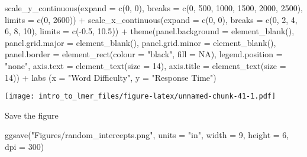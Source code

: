\documentclass[
]{article}
\newenvironment{Shaded}{\begin{snugshade}}{\end{snugshade}}
\newcommand{\AttributeTok}[1]{\textcolor[rgb]{0.77,0.63,0.00}{#1}}
\newcommand{\ConstantTok}[1]{\textcolor[rgb]{0.00,0.00,0.00}{#1}}
\newcommand{\DecValTok}[1]{\textcolor[rgb]{0.00,0.00,0.81}{#1}}
\newcommand{\FloatTok}[1]{\textcolor[rgb]{0.00,0.00,0.81}{#1}}
\newcommand{\FunctionTok}[1]{\textcolor[rgb]{0.00,0.00,0.00}{#1}}
\newcommand{\NormalTok}[1]{#1}
\newcommand{\SpecialCharTok}[1]{\textcolor[rgb]{0.00,0.00,0.00}{#1}}
\newcommand{\StringTok}[1]{\textcolor[rgb]{0.31,0.60,0.02}{#1}}
\begin{document}
\begin{Shaded}
\begin{Highlighting}[]
  \FunctionTok{scale\_y\_continuous}\NormalTok{(}\AttributeTok{expand =} \FunctionTok{c}\NormalTok{(}\DecValTok{0}\NormalTok{, }\DecValTok{0}\NormalTok{), }\AttributeTok{breaks =} \FunctionTok{c}\NormalTok{(}\DecValTok{0}\NormalTok{, }\DecValTok{500}\NormalTok{, }\DecValTok{1000}\NormalTok{, }\DecValTok{1500}\NormalTok{, }\DecValTok{2000}\NormalTok{, }\DecValTok{2500}\NormalTok{), }
                     \AttributeTok{limits =} \FunctionTok{c}\NormalTok{(}\DecValTok{0}\NormalTok{, }\DecValTok{2600}\NormalTok{)) }\SpecialCharTok{+}
  \FunctionTok{scale\_x\_continuous}\NormalTok{(}\AttributeTok{expand =} \FunctionTok{c}\NormalTok{(}\DecValTok{0}\NormalTok{, }\DecValTok{0}\NormalTok{), }\AttributeTok{breaks =} \FunctionTok{c}\NormalTok{(}\DecValTok{0}\NormalTok{, }\DecValTok{2}\NormalTok{, }\DecValTok{4}\NormalTok{, }\DecValTok{6}\NormalTok{, }\DecValTok{8}\NormalTok{, }\DecValTok{10}\NormalTok{), }
                     \AttributeTok{limits =} \FunctionTok{c}\NormalTok{(}\SpecialCharTok{{-}}\FloatTok{0.5}\NormalTok{, }\FloatTok{10.5}\NormalTok{)) }\SpecialCharTok{+}
  \FunctionTok{theme}\NormalTok{(}\AttributeTok{panel.background =} \FunctionTok{element\_blank}\NormalTok{(),         }
        \AttributeTok{panel.grid.major =} \FunctionTok{element\_blank}\NormalTok{(),}
        \AttributeTok{panel.grid.minor =} \FunctionTok{element\_blank}\NormalTok{(),}
        \AttributeTok{panel.border =} \FunctionTok{element\_rect}\NormalTok{(}\AttributeTok{colour =} \StringTok{"black"}\NormalTok{, }\AttributeTok{fill =} \ConstantTok{NA}\NormalTok{),}
        \AttributeTok{legend.position =} \StringTok{"none"}\NormalTok{,}
        \AttributeTok{axis.text =} \FunctionTok{element\_text}\NormalTok{(}\AttributeTok{size =} \DecValTok{14}\NormalTok{), }
        \AttributeTok{axis.title =} \FunctionTok{element\_text}\NormalTok{(}\AttributeTok{size =} \DecValTok{14}\NormalTok{)) }\SpecialCharTok{+}
  \FunctionTok{labs}\NormalTok{ (}\AttributeTok{x =} \StringTok{"Word Difficulty"}\NormalTok{, }\AttributeTok{y =} \StringTok{"Response Time"}\NormalTok{) }
\end{Highlighting}
\end{Shaded}

\texttt{[image: intro\_to\_lmer\_files/figure-latex/unnamed-chunk-41-1.pdf]}

Save the figure

\begin{Shaded}
\begin{Highlighting}[]
\FunctionTok{ggsave}\NormalTok{(}\StringTok{"Figures/random\_intercepts.png"}\NormalTok{, }\AttributeTok{units =} \StringTok{"in"}\NormalTok{, }\AttributeTok{width =} \DecValTok{9}\NormalTok{, }\AttributeTok{height =} \DecValTok{6}\NormalTok{, }\AttributeTok{dpi =} \DecValTok{300}\NormalTok{)}
\end{Highlighting}
\end{Shaded}
\end{document}
